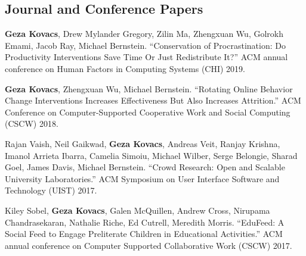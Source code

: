 \documentclass[margin,line]{resume}
\begin{document}
\begin{resume}





\section{\mysidestyle Journal and Conference Papers}


\textbf{Geza Kovacs}, Drew Mylander Gregory, Zilin Ma, Zhengxuan Wu, Golrokh Emami, Jacob Ray, Michael Bernstein. ``Conservation of Procrastination: Do Productivity Interventions Save Time Or Just Redistribute It?'' ACM annual conference on Human Factors in Computing Systems (CHI) 2019. %

\textbf{Geza Kovacs}, Zhengxuan Wu, Michael Bernstein. ``Rotating Online Behavior Change Interventions Increases Effectiveness But Also Increases Attrition.'' ACM Conference on Computer-Supported Cooperative Work and Social Computing (CSCW) 2018. %

Rajan Vaish, Neil Gaikwad, \textbf{Geza Kovacs}, Andreas Veit, Ranjay Krishna, Imanol Arrieta Ibarra, Camelia Simoiu, Michael Wilber, Serge Belongie, Sharad Goel, James Davis, Michael Bernstein. ``Crowd Research: Open and Scalable University Laboratories.'' ACM Symposium on User Interface Software and Technology (UIST) 2017. %

Kiley Sobel, \textbf{Geza Kovacs}, Galen McQuillen, Andrew Cross, Nirupama Chandrasekaran, Nathalie Riche, Ed Cutrell, Meredith Morris. ``EduFeed: A Social Feed to Engage Preliterate Children in Educational Activities.'' ACM annual conference on Computer Supported Collaborative Work (CSCW) 2017. %


\end{resume}
\end{document}
